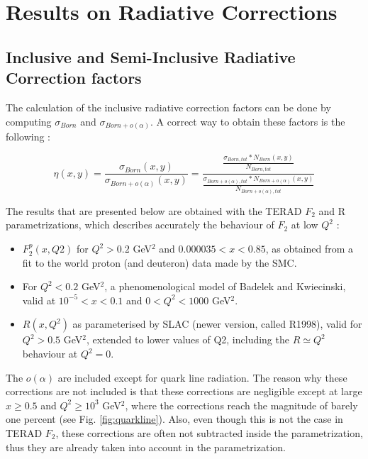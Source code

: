 
\chapter{Results on Radiative Corrections} %

\label{ch:RC} %


\section{Inclusive and Semi-Inclusive Radiative Correction factors}\label{sec:RCF}

The calculation of the inclusive radiative correction factors can be done by computing
$\sigma_{Born}$ and $\sigma_{Born+o(\alpha)}$. A correct way to obtain these factors is the following :

\[\eta(x,y)=\frac{\sigma_{Born}(x,y)}{\sigma_{Born+o(\alpha)}(x,y)}
=\frac{\frac{\sigma_{Born,tot}*N_{Born}(x,y)}{N_{Born,tot}}}{\frac{\sigma_{Born+o(\alpha),tot}*N_{Born+o(\alpha)}(x,y)}{N_{Born+o(\alpha),tot}}}\]

The results that are presented below are obtained with the TERAD $F_{2}$ and R parametrizations, which
describes accurately the behaviour of $F_{2}$ at low $Q^{2}$\cite{BPnote} :

\begin{itemize}
\item $F^{p}_{2}(x,Q2)$ for $Q^2 > 0.2$ GeV$^2$ and $0.000035 < x < 0.85$, as obtained from a fit to the
world proton (and deuteron) data made by the SMC\cite{SMC}.
\item For $Q^2 < 0.2$ GeV$^2$, a phenomenological model of Badelek and Kwiecinski\cite{BK}, valid at $10^{-5} < x < 0.1$
and $0 < Q^2 < 1000$ GeV$^2$.
\item $R(x, Q^2)$ as parameterised by SLAC (newer version, called R1998\cite{R1998}), valid for $Q^2 > 0.5$ GeV$^2$, extended
to lower values of Q2, including the $R \simeq Q^2$ behaviour at $Q^2 = 0$.
\end{itemize}

The $o(\alpha)$ are included except for quark line radiation. The reason why these corrections are not
included is that these corrections are negligible except at large $x \geq 0.5$ and $Q^{2} \geq 10^3$ GeV$^2$,
where the corrections reach the magnitude of barely one percent (see Fig. \ref{fig:quarkline}). Also, even though this is not the
case in TERAD $F_{2}$, these corrections are often not subtracted inside the parametrization, thus
they are already taken into account in the parametrization\cite{HubertF2Rad}.

